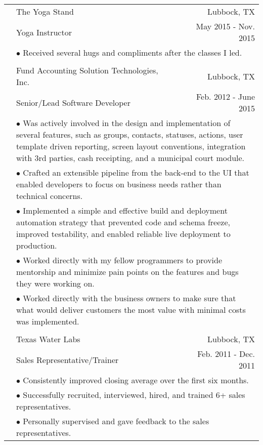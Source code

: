 \documentclass[11pt,oneside,letterpaper,titlepage,fleqn]{article}
\begin{document}
\begin{tabular}[h]{@{}p{3.25cm}@{}lr}
\\                    
& The Yoga Stand & Lubbock, TX\\
           & Yoga Instructor & May 2015 - Nov. 2015\\
           & \multicolumn{2}{p{14cm}}{$\bullet$ Received several hugs and compliments after the classes I led.}\\
\\          				
& Fund Accounting Solution Technologies, Inc. & Lubbock, TX\\
           & Senior/Lead Software Developer & Feb. 2012 - June 2015\\
           & \multicolumn{2}{p{14cm}}{$\bullet$ Was actively involved in the design and implementation of several features, such as groups,
 contacts, statuses, actions, user template driven reporting, screen layout conventions,
integration with 3rd parties, cash receipting, and a municipal court module.}\\
           & \multicolumn{2}{p{14cm}}{$\bullet$ Crafted an extensible pipeline from the back-end to the UI that enabled developers to
 focus on business needs rather than technical concerns.}\\
           & \multicolumn{2}{p{14cm}}{$\bullet$ Implemented a simple and effective build and deployment automation strategy that prevented
 code and schema freeze, improved testability, and enabled reliable live deployment to production.}\\
           & \multicolumn{2}{p{14cm}}{$\bullet$ Worked directly with my fellow programmers to provide mentorship and minimize pain points
 on the features and bugs they were working on.}\\			
           & \multicolumn{2}{p{14cm}}{$\bullet$ Worked directly with the business owners to make sure that what would deliver customers the
 most value with minimal costs was implemented.}\\
\\
						& Texas Water Labs & Lubbock, TX\\
						& Sales Representative/Trainer	 &  Feb. 2011 - Dec. 2011\\
           & \multicolumn{2}{p{14cm}}{$\bullet$ Consistently improved closing average over the first six months.}\\
           & \multicolumn{2}{p{14cm}}{$\bullet$ Successfully recruited, interviewed, hired, and trained 6+ sales representatives.}\\
           & \multicolumn{2}{p{14cm}}{$\bullet$ Personally supervised and gave feedback to the sales representatives.}\\
\end{tabular}	
\end{document}
